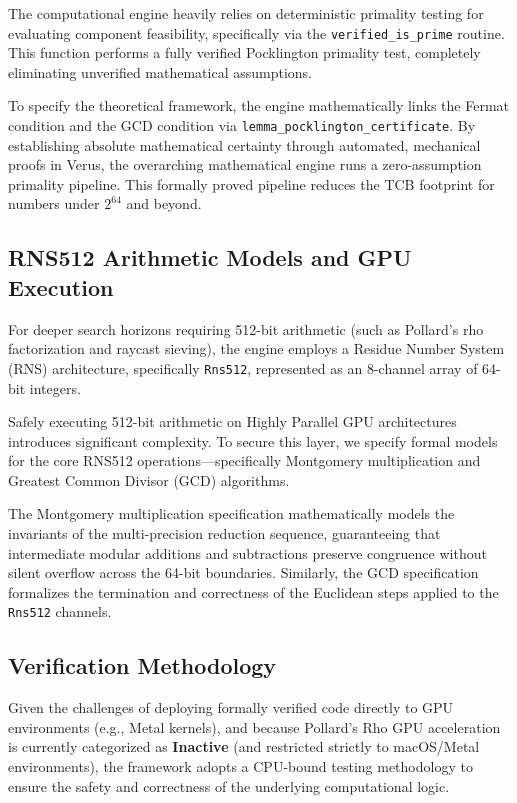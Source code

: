 The computational engine heavily relies on deterministic primality testing for evaluating component feasibility, specifically via the \texttt{verified\_is\_prime} routine. This function performs a fully verified Pocklington primality test, completely eliminating unverified mathematical assumptions.

To specify the theoretical framework, the engine mathematically links the Fermat condition and the GCD condition via \texttt{lemma\_pocklington\_certificate}. By establishing absolute mathematical certainty through automated, mechanical proofs in Verus, the overarching mathematical engine runs a zero-assumption primality pipeline. This formally proved pipeline reduces the TCB footprint for numbers under $2^{64}$ and beyond.

\subsection{RNS512 Arithmetic Models and GPU Execution}
\label{app:subsec:rns512}

For deeper search horizons requiring 512-bit arithmetic (such as Pollard's rho factorization and raycast sieving), the engine employs a Residue Number System (RNS) architecture, specifically \texttt{Rns512}, represented as an 8-channel array of 64-bit integers.

Safely executing 512-bit arithmetic on Highly Parallel GPU architectures introduces significant complexity. To secure this layer, we specify formal models for the core RNS512 operations---specifically Montgomery multiplication and Greatest Common Divisor (GCD) algorithms. 

The Montgomery multiplication specification mathematically models the invariants of the multi-precision reduction sequence, guaranteeing that intermediate modular additions and subtractions preserve congruence without silent overflow across the 64-bit boundaries. Similarly, the GCD specification formalizes the termination and correctness of the Euclidean steps applied to the \texttt{Rns512} channels.

\subsection{Verification Methodology}
\label{app:subsec:hybrid_verification}

Given the challenges of deploying formally verified code directly to GPU environments (e.g., Metal kernels), and because Pollard's Rho GPU acceleration is currently categorized as \textbf{Inactive} (and restricted strictly to macOS/Metal environments), the framework adopts a CPU-bound testing methodology to ensure the safety and correctness of the underlying computational logic.

